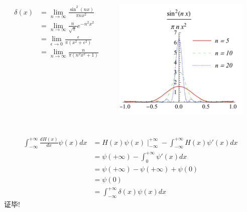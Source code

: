 \begin{frame}
	\frametitle{}
		\begin{columns}
			\begin{column}[t]{0.46\linewidth}
	\[\begin{aligned}
			\delta(x) &= \lim_{n \to \infty} \frac{\sin^2(nx)}{\pi n x^2 }  \\
			&= \lim_{n \to \infty} \frac{n}{\sqrt{\pi} } e^{-n^2x^2} \\
			&= \lim_{\epsilon \to 0} \frac{\epsilon}{\pi(x^2+\epsilon^2)}  \\
			&= \lim_{n \to \infty} \frac{n}{\pi(n^2x^2+1)}  
	\end{aligned}\]			
			\end{column}
			\begin{column}[t]{0.46\linewidth}
				  \begin{center}
					   \includegraphics[width=0.9\textwidth,height=2.3in]{figs/5-1.png}
				  \end{center}
			\end{column}
		\end{columns}
\end{frame}

\begin{frame}
	\frametitle{}
	\证 \[
		\begin{aligned}
		  \int_{-\infty}^{+\infty} \frac{dH(x)}{dx} \psi (x) d x &= H(x) \psi (x)\mid_{-\infty}^{+\infty} - \int_{-\infty}^{+\infty} H(x) \psi' (x) d x \\
		    &=  \psi (+\infty) - \int_{0}^{+\infty} \psi' (x) d x\\
			&=  \psi (+\infty)- \psi (+\infty)+\psi (0)\\
			&=  \psi (0) \\ 
			&=\int_{-\infty}^{+\infty} \delta(x) \psi (x) d x
		\end{aligned}
		   \]
		证毕!
\end{frame}

